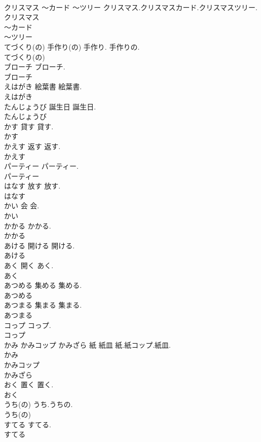 \documentclass[8pt]{extreport}
\begin{document}
\begin{CJK}{UTF8}{min}
\\	クリスマス ～カード ～ツリー		クリスマス.クリスマスカード.クリスマスツリー.	
\\	クリスマス
\\	～カード
\\	～ツリー
\\	てづくり(の)	手作り(の)	手作り. 手作りの.	
\\	てづくり(の)
\\	ブローチ		ブローチ.	
\\	ブローチ
\\	えはがき	絵葉書	絵葉書.	
\\	えはがき
\\	たんじょうび	誕生日	誕生日.	
\\	たんじょうび
\\	かす	貸す	貸す.	
\\	かす
\\	かえす	返す	返す.	
\\	かえす
\\	パーティー		パーティー.	
\\	パーティー
\\	はなす	放す	放す.	
\\	はなす
\\	かい	会	会.	
\\	かい
\\	かかる		かかる.	
\\	かかる
\\	あける	開ける	開ける.	
\\	あける
\\	あく	開く	あく.	
\\	あく
\\	あつめる	集める	集める.	
\\	あつめる
\\	あつまる	集まる	集まる.	
\\	あつまる
\\	コっプ		コっプ.	
\\	コっプ
\\	かみ かみコップ かみざら	紙 紙皿	紙.紙コップ.紙皿.	
\\	かみ
\\	かみコップ
\\	かみざら
\\	おく	置く	置く.	
\\	おく
\\	うち(の)		うち.うちの.	
\\	うち(の)
\\	すてる		すてる.	
\\	すてる

\end{CJK}
\end{document}
